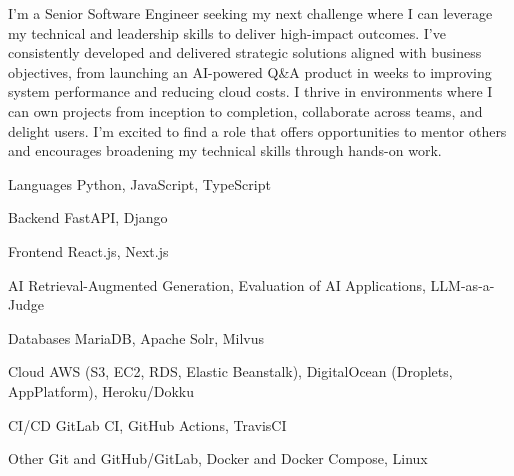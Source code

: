 \documentclass[11pt, a4paper]{awesome-cv}
\begin{document}
\makecvheader[C]




\begin{cvparagraph}
  I'm a Senior Software Engineer seeking my next challenge where I can leverage my technical and leadership skills to deliver high-impact outcomes. I've consistently developed and delivered strategic solutions aligned with business objectives, from launching an AI-powered Q\&A product in weeks to improving system performance and reducing cloud costs. I thrive in environments where I can own projects from inception to completion, collaborate across teams, and delight users. I'm excited to find a role that offers opportunities to mentor others and encourages broadening my technical skills through hands-on work.
\end{cvparagraph}



\begin{cvskills}

  \cvskill
    {Languages}
    {Python, JavaScript, TypeScript}

  \cvskill
    {Backend}
    {FastAPI, Django}

  \cvskill
    {Frontend}
    {React.js, Next.js}

  \cvskill
    {AI}
    {Retrieval-Augmented Generation, Evaluation of AI Applications, LLM-as-a-Judge}

  \cvskill
    {Databases}
    {MariaDB, Apache Solr, Milvus}

  \cvskill
    {Cloud}
    {AWS (S3, EC2, RDS, Elastic Beanstalk), DigitalOcean (Droplets, AppPlatform), Heroku/Dokku}

  \cvskill
    {CI/CD}
    {GitLab CI, GitHub Actions, TravisCI}

  \cvskill
    {Other}
    {Git and GitHub/GitLab, Docker and Docker Compose, Linux}

\end{cvskills}
\end{document}
